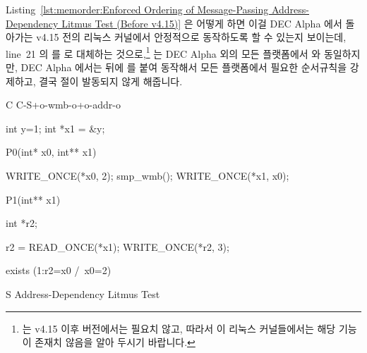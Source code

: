 Listing~\ref{lst:memorder:Enforced Ordering of Message-Passing Address-Dependency Litmus Test (Before v4.15)}
은 어떻게 하면 이걸 DEC Alpha 에서 돌아가는 v4.15 전의 리눅스 커널에서 안정적으로
동작하도록 할 수 있는지 보이는데, line~21 의  를
 로 대체하는 것으로,\footnote{
	 는 v4.15 이후 버전에서는 필요치 않고,
	따라서 이 리눅스 커널들에서는 해당 기능이 존재치 않음을 알아 두시기
	바랍니다.}
 는 DEC Alpha 외의 모든 플랫폼에서 
와 동일하지만, DEC Alpha 에서는  뒤에  를 붙여
동작해서 모든 플랫폼에서 필요한 순서규칙을 강제하고, 결국  절이
발동되지 않게 해줍니다.

\begin{listing}[tbp]
{ \scriptsize
\begin{verbbox}[\LstLineNo]
C C-S+o-wmb-o+o-addr-o

{
int y=1;
int *x1 = &y;
}

P0(int* x0, int** x1) {

  WRITE_ONCE(*x0, 2);
  smp_wmb();
  WRITE_ONCE(*x1, x0);

}

P1(int** x1) {

  int *r2;

  r2 = READ_ONCE(*x1);
  WRITE_ONCE(*r2, 3);

}

exists (1:r2=x0 /\ x0=2)
\end{verbbox}
}
\centering
\theverbbox
\caption{S Address-Dependency Litmus Test}
\label{lst:memorder:S Address-Dependency Litmus Test}
\end{listing}

